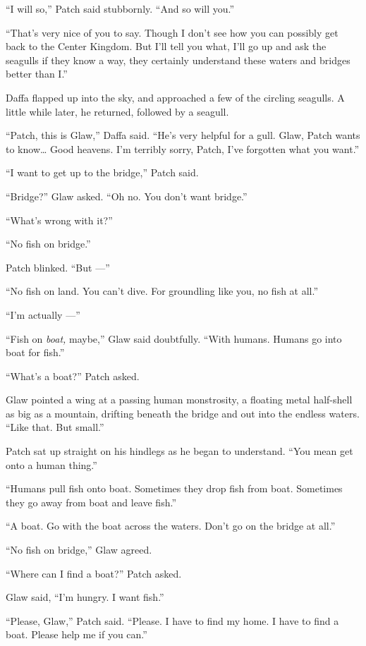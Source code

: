 \documentclass[ebook,oneside,openany,17pt]{memoir}
\newenvironment{tolerant}[1]{%
  \par\tolerance=#1\relax
}{%
  \par
}
\begin{document}
“I will so,” Patch said stubbornly. “And so will you.”

“That’s very nice of you to say. Though I don’t see how you can
possibly get back to the Center Kingdom. But I’ll tell you what, I’ll
go up and ask the seagulls if they know a way, they certainly
understand these waters and bridges better than I.”

Daffa flapped up into the sky, and approached a few of the circling
seagulls. A little while later, he returned, followed by a seagull.

\begin{tolerant}{1000}
“Patch, this is Glaw,” Daffa said. “He’s very helpful for a
gull. Glaw, Patch wants to know… Good heavens. I’m terribly sorry,
Patch, I’ve forgotten what you want.”
\end{tolerant}

“I want to get up to the bridge,” Patch said.

“Bridge?” Glaw asked. “Oh no. You don’t want bridge.”

“What’s wrong with it?”

“No fish on bridge.”

Patch blinked. “But —”

“No fish on land. You can’t dive. For groundling like you, no fish at
all.”

“I’m actually —”

“Fish on \emph{boat,} maybe,” Glaw said doubtfully. “With
humans. Humans go into boat for fish.”

“What’s a boat?” Patch asked.

Glaw pointed a wing at a passing human monstrosity, a floating metal
half-shell as big as a mountain, drifting beneath the bridge and out
into the endless waters. “Like that. But small.”

Patch sat up straight on his hindlegs as he began to understand. “You
mean get onto a human thing.”

“Humans pull fish onto boat. Sometimes they drop fish from
boat. Sometimes they go away from boat and leave fish.”

“A boat. Go with the boat across the waters. Don’t go on the bridge at
all.”

“No fish on bridge,” Glaw agreed.

“Where can I find a boat?” Patch asked.

Glaw said, “I’m hungry. I want fish.”

“Please, Glaw,” Patch said. “Please. I have to find my home. I have to
find a boat. Please help me if you can.”
\end{document}
